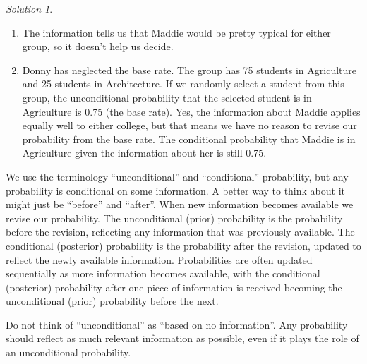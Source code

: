 \documentclass[
  letterpaper,
  DIV=11,
  numbers=noendperiod]{scrreprt}
\providecommand{\tightlist}{%
  \setlength{\itemsep}{0pt}\setlength{\parskip}{0pt}}
\theoremstyle{plain}
\theoremstyle{definition}
\theoremstyle{definition}
\theoremstyle{definition}
\theoremstyle{remark}
\newtheorem{refsolution}{Solution}[chapter]
\begin{document}
\begin{tcolorbox}[enhanced jigsaw, opacityback=0, rightrule=.15mm, coltitle=black, colframe=quarto-callout-tip-color-frame, toprule=.15mm, colbacktitle=quarto-callout-tip-color!10!white, opacitybacktitle=0.6, left=2mm, toptitle=1mm, breakable, title={Solution (click to expand)}, bottomtitle=1mm, colback=white, leftrule=.75mm, titlerule=0mm, arc=.35mm, bottomrule=.15mm]

\begin{refsolution}
\leavevmode

\begin{enumerate}
\def\labelenumi{\arabic{enumi}.}
\tightlist
\item
  The information tells us that Maddie would be pretty typical for
  either group, so it doesn't help us decide.
\item
  Donny has neglected the base rate. The group has 75 students in
  Agriculture and 25 students in Architecture. If we randomly select a
  student from this group, the unconditional probability that the
  selected student is in Agriculture is 0.75 (the base rate). Yes, the
  information about Maddie applies equally well to either college, but
  that means we have no reason to revise our probability from the base
  rate. The conditional probability that Maddie is in Agriculture given
  the information about her is still 0.75.
\end{enumerate}

\label{sol-bayes-false-positive-twoway}

\end{refsolution}

\end{tcolorbox}

We use the terminology ``unconditional'' and ``conditional''
probability, but any probability is conditional on some information. A
better way to think about it might just be ``before'' and ``after''.
When new information becomes available we revise our probability. The
unconditional (prior) probability is the probability before the
revision, reflecting any information that was previously available. The
conditional (posterior) probability is the probability after the
revision, updated to reflect the newly available information.
Probabilities are often updated sequentially as more information becomes
available, with the conditional (posterior) probability after one piece
of information is received becoming the unconditional (prior)
probability before the next.

Do not think of ``unconditional'' as ``based on no information''. Any
probability should reflect as much relevant information as possible,
even if it plays the role of an unconditional probability.
\end{document}
